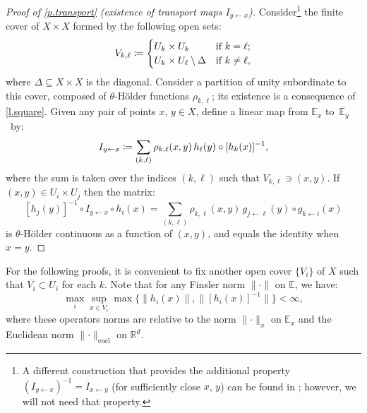 \documentclass[10pt]{amsart}
\def\vcentcolon{\mathrel{\mathop\ordinarycolon}}
\providecommand\ordinarycolon{:}
\providecommand*\coloneqq{\vcentcolon\mathrel{\mkern-1.2mu}=}
\theoremstyle{plain}
\theoremstyle{definition}
\newcommand{\RR}{\mathbb{R}}
\newcommand{\EE}{\mathbb{E}}
\begin{document}
\skpt
\begin{proof}[Proof of \cref{p.transport} (existence of transport maps $I_{y \gets x}$)]
Consider\footnote{A different construction that provides the additional property $(I_{y \gets x})^{-1} = I_{x \gets y}$ (for sufficiently close $x$, $y$) can be found in \cite[p.\,169]{KalSad}; however, we will not need that property.}
the finite cover of $X \times X$ formed by the following open sets:
\[
V_{k,\ell} \coloneqq
\begin{cases}
	U_k \times U_k &\text{if $k=\ell$;} \\
	U_k \times U_\ell \setminus \Delta &\text{if $k\neq\ell$,}
\end{cases}
\]
where $\Delta \subseteq X \times X$ is the diagonal.
Consider a partition of unity subordinate to this cover, composed of $\theta$-Hölder functions $\rho_{k,\ell}$; its existence is a consequence of \cref{l.square}.
Given any pair of points $x$, $y \in X$, define a linear map from $\EE_x$ to~$\EE_y$~by:
\[
I_{y \gets x} \coloneqq \sum_{(k, \ell)} \rho_{k,\ell}(x,y) \, h_\ell(y) \circ [h_k(x)]^{-1},
\]
where the sum is taken over the indices $(k, \ell)$ such that $V_{k,\ell} \ni (x,y)$.
If $(x,y) \in U_i \times U_j$ then the matrix:
\[
[h_j(y)]^{-1} \circ I_{y \gets x} \circ h_i(x) =
\sum_{(k, \ell)} \rho_{k,\ell}(x,y) \, g_{j \gets \ell}(y) \circ g_{k \gets i}(x)
\]
is $\theta$-Hölder continuous as a function of $(x,y)$,
and equals the identity when $x = y$.
\end{proof}

For the following proofs, it is convenient to fix another open cover $\{V_i\}$ of $X$ such that $\overline{V_i} \subset U_i$ for each $k$.
Note that for any Finsler norm $\| \mathord{\cdot} \|$ on $\EE$, we have:
\begin{equation}\label{e.h_i_bounded}
\max_i \sup_{x \in V_i} \max \big\{ \|h_i(x)\|, \|[h_i(x)]^{-1}\| \big\} < \infty,
\end{equation}
where these operators norms are relative to the norm $\| \mathord{\cdot} \|_x$ on $\EE_x$ and the Euclidean norm $\| \mathord{\cdot} \|_\mathrm{eucl}$ on $\RR^d$.
\end{document}

